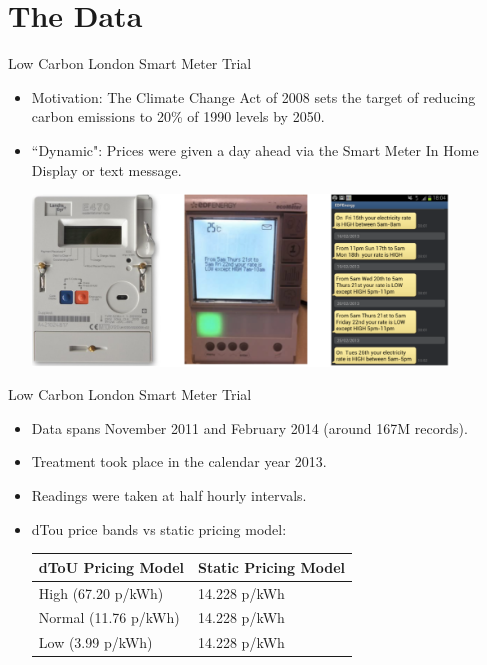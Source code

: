 \documentclass{beamer}
\begin{document}
\section{The Data}

\begin{frame}{Low Carbon London Smart Meter Trial}
  \begin{itemize}
    \item<+-> Motivation: The Climate Change Act of 2008 sets the target of reducing carbon emissions to 20\% of 1990 levels by 2050.
    \item<+-> ``Dynamic": Prices were given a day ahead via the Smart Meter In Home Display or text message.
    \vspace{0.3cm}
    \begin{center}
    \includegraphics[width=0.87\textwidth]{images/day-ahead-pricing.png}
    \end{center}
  \end{itemize}
\end{frame}

\begin{frame}{Low Carbon London Smart Meter Trial}
  \begin{itemize}
    \item<+-> Data spans November 2011 and February 2014 (around 167M records).
    \item<+-> Treatment took place in the calendar year 2013.
    \item<+-> Readings were taken at half hourly intervals.
    \item<+-> dTou price bands vs static pricing model:
    \begin{table}[]
      \vspace{0.2cm}
      \centering
      \begin{tabular}{|l|l|}
        \hline
        dToU Pricing Model & Static Pricing Model \\ \hline
        High (67.20 p/kWh) & 14.228 p/kWh \\ \hline
        Normal (11.76 p/kWh) & 14.228 p/kWh \\ \hline
        Low (3.99 p/kWh) & 14.228 p/kWh \\ \hline
      \end{tabular}
    \end{table}
  \end{itemize}
\end{frame}
\end{document}
